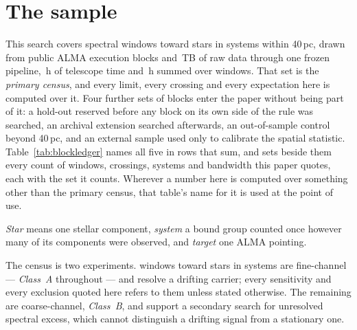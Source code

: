 \section{The sample}
\label{sec:sample}

This search covers \NWindows{} spectral windows toward \NStars{}
stars in \NSystems{} systems within 40\,pc, drawn from \NEB{}
public ALMA execution blocks and \TotalDataTB\,TB of raw data through one
frozen pipeline, \StTelHours\,h of telescope time and \LdgCensusHours\,h
summed over windows. That set is the \emph{primary census}, and every limit,
every crossing and every expectation here is computed over it. Four further
sets of blocks enter the paper without being part of it: a hold-out reserved
before any block on its own side of the rule was searched, an archival
extension searched afterwards, an out-of-sample control beyond 40\,pc, and an
external sample used only to calibrate the spatial statistic.
Table~\ref{tab:blockledger} names all five in rows that sum, and sets beside
them every count of windows, crossings, systems and bandwidth this paper
quotes, each with the set it counts. Wherever a number here is computed over
something other than the primary census, that table's name for it is used at
the point of use.

\emph{Star} means one stellar component, \emph{system} a bound group
counted once however many of its components were observed, and \emph{target}
one ALMA pointing.

The census is two experiments. \NWinA{} windows toward
\LdgClassAStars{} stars in \NSysClassA{} systems are fine-channel ---
\emph{Class~A} throughout --- and resolve a drifting carrier; every
sensitivity and every exclusion quoted here refers to them unless stated
otherwise. The remaining \NWinB{} are coarse-channel, \emph{Class~B}, and
support a secondary search for unresolved spectral excess, which cannot
distinguish a drifting signal from a stationary one.

